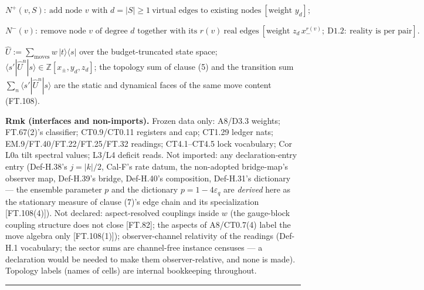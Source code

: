 \begin{definition}
\[
N^+(v,S):\ \text{add node }v\text{ with }d=|S|\ge1\ \text{virtual edges to existing nodes}\ [\text{weight }y_d];
\]

\[
N^-(v):\ \text{remove node }v\text{ of degree }d\text{ together with its }r(v)\ \text{real edges}\ [\text{weight }z_d\,x_-^{r(v)};\ \mathrm{D1.2}:\ \text{reality is per pair}].
\]

$\hat U:=\sum_{\text{moves}}w\,|t\rangle\langle s|$ over the budget-truncated state space; $\langle s'|\hat U^n|s\rangle\in\mathbb Z[x_\pm,y_d,z_d]$; the topology sum of clause (5) and the transition sum $\sum_n\langle s'|\hat U^n|s\rangle$ are the static and dynamical faces of the same move content (FT.108).

\textbf{Rmk (interfaces and non-imports).} Frozen data only: A8/D3.3 weights; FT.67(2)'s classifier; CT0.9/CT0.11 registers and cap; CT1.29 ledger nats; EM.9/FT.40/FT.22/FT.25/FT.32 readings; CT4.1–CT4.5 lock vocabulary; Cor L0a tilt spectral values; L3/L4 deficit reads. Not imported: any declaration-entry entry (Def-H.38's $j=|k|/2$, Cal-F's rate datum, the non-adopted bridge-map's observer map, Def-H.39's bridge, Def-H.40's composition, Def-H.31's dictionary — the ensemble parameter $p$ and the dictionary $p=1-4\varepsilon_q$ are \textit{derived} here as the stationary measure of clause (7)'s edge chain and its specialization [FT.108(4)]). Not declared: aspect-resolved couplings inside $w$ (the gauge-block coupling structure does not close [FT.82]; the aspects of A8/CT0.7(4) label the move algebra only [FT.108(1)]); observer-channel relativity of the readings (Def-H.1 vocabulary; the sector sums are channel-free instance censuses — a declaration would be needed to make them observer-relative, and none is made). Topology labels (names of cells) are internal bookkeeping throughout.

\vspace{2pt}\noindent\rule{\textwidth}{0.4pt}\vspace{2pt}

\end{definition}

